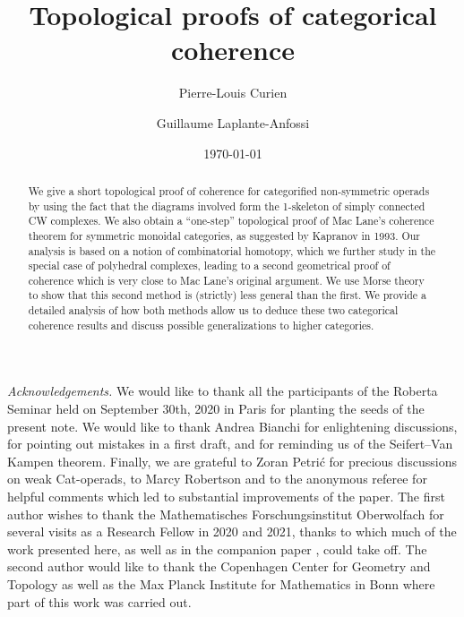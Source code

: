 \documentclass[11pt]{amsart}
\title{Topological proofs of categorical coherence}
\author{Pierre-Louis Curien}
\author{Guillaume Laplante-Anfossi}
\date{\today}
\begin{document}
\begin{abstract}
We give a short topological proof of coherence for categorified non-symmetric operads by using the fact that the diagrams involved form the 1-skeleton of simply connected CW complexes. 
We also obtain a ``one-step'' topological proof of Mac Lane's coherence theorem for symmetric monoidal categories, as suggested by Kapranov in 1993.  
Our analysis is based on a notion of combinatorial homotopy, which we further study in the special case of polyhedral complexes, leading to a second geometrical proof of coherence which is very close to Mac Lane's original argument.  
We use Morse theory to show that this second method is (strictly) less general than the first.
We provide a detailed analysis of how  both methods allow us to deduce these two categorical coherence results and discuss possible generalizations to higher categories. 
\end{abstract}

\maketitle

\setcounter{tocdepth}{1}






\bigskip

\emph{Acknowledgements.}   
We would like to thank all the participants of the Roberta Seminar held on September 30th, 2020 in Paris for planting the seeds of the present note.  
We would like to thank Andrea Bianchi for enlightening discussions, for pointing out mistakes in a first draft, and for reminding us of the Seifert--Van Kampen theorem. 
Finally, we are grateful to Zoran Petri{\'c} for precious discussions on weak Cat-operads, to Marcy Robertson and to the anonymous referee for helpful comments which led to substantial improvements of the paper.
The first author wishes to thank the Mathematisches Forschungsinstitut Oberwolfach for several visits as a Research Fellow in 2020 and 2021, thanks to which much of the work presented here, as well as in the companion paper \cite{CLA24}, could take off.
The second author would like to thank the Copenhagen Center for Geometry and Topology as well as the Max Planck Institute for Mathematics in Bonn where part of this work was carried out.





\end{document}
